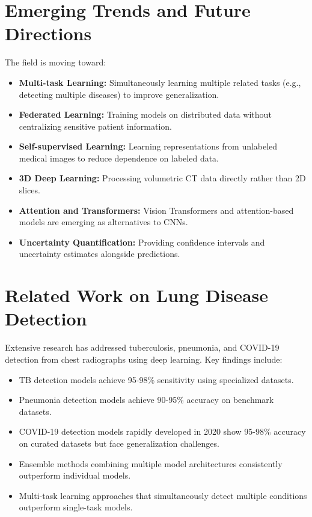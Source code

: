 {\section{Emerging Trends and Future Directions}

The field is moving toward:

\begin{itemize}
    \item \textbf{Multi-task Learning:} Simultaneously learning multiple related tasks (e.g., detecting multiple diseases) to improve generalization.
    \item \textbf{Federated Learning:} Training models on distributed data without centralizing sensitive patient information.
    \item \textbf{Self-supervised Learning:} Learning representations from unlabeled medical images to reduce dependence on labeled data.
    \item \textbf{3D Deep Learning:} Processing volumetric CT data directly rather than 2D slices.
    \item \textbf{Attention and Transformers:} Vision Transformers and attention-based models are emerging as alternatives to CNNs.
    \item \textbf{Uncertainty Quantification:} Providing confidence intervals and uncertainty estimates alongside predictions.
\end{itemize}

\section{Related Work on Lung Disease Detection}

Extensive research has addressed tuberculosis, pneumonia, and COVID-19 detection from chest radiographs using deep learning. Key findings include:

\begin{itemize}
    \item TB detection models achieve 95-98\% sensitivity using specialized datasets.
    \item Pneumonia detection models achieve 90-95\% accuracy on benchmark datasets.
    \item COVID-19 detection models rapidly developed in 2020 show 95-98\% accuracy on curated datasets but face generalization challenges.
    \item Ensemble methods combining multiple model architectures consistently outperform individual models.
    \item Multi-task learning approaches that simultaneously detect multiple conditions outperform single-task models.
\end{itemize}

}
